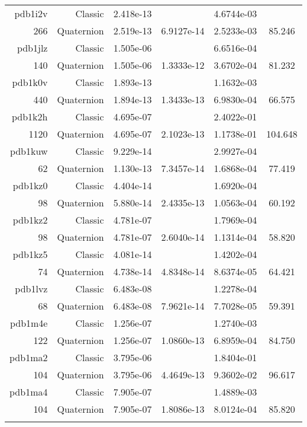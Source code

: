 \begin{xltabular}{\textwidth}{r|rS[table-format=1.3e+2]S[table-format=1.4e+2]S[table-format=1.4e+2]S[table-format=-1.3]}
pdb1i2v & Classic & 2.418e-13 &  & 4.6744e-03 & \\
266 & Quaternion & 2.519e-13 & 6.9127e-14 & 2.5233e-03 & 85.246\\  \addlinespace
pdb1jlz & Classic & 1.505e-06 &  & 6.6516e-04 & \\
140 & Quaternion & 1.505e-06 & 1.3333e-12 & 3.6702e-04 & 81.232\\  \addlinespace
pdb1k0v & Classic & 1.893e-13 &  & 1.1632e-03 & \\
440 & Quaternion & 1.894e-13 & 1.3433e-13 & 6.9830e-04 & 66.575\\  \addlinespace
pdb1k2h & Classic & 4.695e-07 &  & 2.4022e-01 & \\
1120 & Quaternion & 4.695e-07 & 2.1023e-13 & 1.1738e-01 & 104.648\\  \addlinespace
pdb1kuw & Classic & 9.229e-14 &  & 2.9927e-04 & \\
62 & Quaternion & 1.130e-13 & 7.3457e-14 & 1.6868e-04 & 77.419\\  \addlinespace
pdb1kz0 & Classic & 4.404e-14 &  & 1.6920e-04 & \\
98 & Quaternion & 5.880e-14 & 2.4335e-13 & 1.0563e-04 & 60.192\\  \addlinespace
pdb1kz2 & Classic & 4.781e-07 &  & 1.7969e-04 & \\
98 & Quaternion & 4.781e-07 & 2.6040e-14 & 1.1314e-04 & 58.820\\  \addlinespace
pdb1kz5 & Classic & 4.081e-14 &  & 1.4202e-04 & \\
74 & Quaternion & 4.738e-14 & 4.8348e-14 & 8.6374e-05 & 64.421\\  \addlinespace
pdb1lvz & Classic & 6.483e-08 &  & 1.2278e-04 & \\
68 & Quaternion & 6.483e-08 & 7.9621e-14 & 7.7028e-05 & 59.391\\  \addlinespace
pdb1m4e & Classic & 1.256e-07 &  & 1.2740e-03 & \\
122 & Quaternion & 1.256e-07 & 1.0860e-13 & 6.8959e-04 & 84.750\\  \addlinespace
pdb1ma2 & Classic & 3.795e-06 &  & 1.8404e-01 & \\
104 & Quaternion & 3.795e-06 & 4.4649e-13 & 9.3602e-02 & 96.617\\  \addlinespace
pdb1ma4 & Classic & 7.905e-07 &  & 1.4889e-03 & \\
104 & Quaternion & 7.905e-07 & 1.8086e-13 & 8.0124e-04 & 85.820\\  \addlinespace

\end{xltabular}
